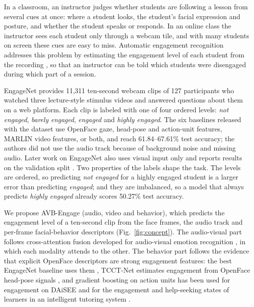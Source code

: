 \documentclass[pdflatex,iicol,sn-basic]{sn-jnl}
\newcommand{\ournet}{AVB-Engage}
\begin{document}
In a classroom, an instructor judges whether students are following a lesson from several cues at once: where a student looks, the student's facial expression and posture, and whether the student speaks or responds. In an online class the instructor sees each student only through a webcam tile, and with many students on screen these cues are easy to miss. Automatic engagement recognition addresses this problem by estimating the engagement level of each student from the recording \citep{qarbal2025review,mandia2023review}, so that an instructor can be told which students were disengaged during which part of a session.

EngageNet \citep{singh2023engagenet} provides 11,311 ten-second webcam clips of 127 participants who watched three lecture-style stimulus videos and answered questions about them on a web platform. Each clip is labeled with one of four ordered levels: \emph{not engaged}, \emph{barely engaged}, \emph{engaged} and \emph{highly engaged}. The six baselines released with the dataset use OpenFace gaze, head-pose and action-unit features, MARLIN video features, or both, and reach 61.84--67.61\% test accuracy; the authors did not use the audio track because of background noise and missing audio. Later work on EngageNet also uses visual input only and reports results on the validation split \citep{vedernikov2024tcct,abedi2024stgcn,vedernikov2026priornet,augusma2026vemd}. Two properties of the labels shape the task. The levels are ordered, so predicting \emph{not engaged} for a highly engaged student is a larger error than predicting \emph{engaged}; and they are imbalanced, so a model that always predicts \emph{highly engaged} already scores 50.27\% test accuracy.

We propose \ournet{} (audio, video and behavior), which predicts the engagement level of a ten-second clip from the face frames, the audio track and per-frame facial-behavior descriptors (Fig.~\ref{fig:concept}). The audio-visual part follows cross-attention fusion developed for audio-visual emotion recognition \citep{venkatraman2025avtca}, in which each modality attends to the other. The behavior part follows the evidence that explicit OpenFace descriptors are strong engagement features: the best EngageNet baseline uses them \citep{singh2023engagenet}, TCCT-Net estimates engagement from OpenFace head-pose signals \citep{vedernikov2024tcct}, and gradient boosting on action units has been used for engagement on DAiSEE \citep{das2025optimizing} and for the engagement and help-seeking states of learners in an intelligent tutoring system \citep{wang2026shap}.
\end{document}
